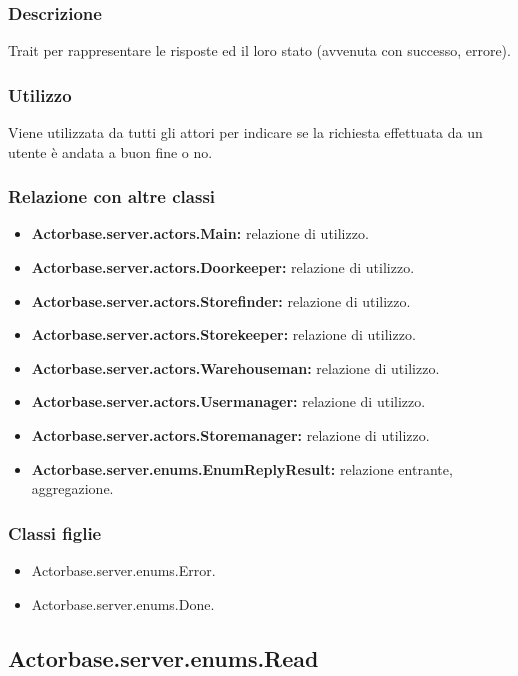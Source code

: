\documentclass[a4paper]{article}
\begin{document}
			\subsubsection{Descrizione}
				Trait per rappresentare le risposte ed il loro stato (avvenuta con successo, errore). 
				
			\subsubsection{Utilizzo}
				Viene utilizzata da tutti gli attori per indicare se la richiesta effettuata da un utente è andata a buon fine o no.
				
			\subsubsection{Relazione con altre classi}
				\begin{itemize}
					\item \textbf{Actorbase.server.actors.Main:} relazione di utilizzo.
					\item \textbf{Actorbase.server.actors.Doorkeeper:} relazione di utilizzo.
					\item \textbf{Actorbase.server.actors.Storefinder:} relazione di utilizzo.
					\item \textbf{Actorbase.server.actors.Storekeeper:} relazione di utilizzo.
					\item \textbf{Actorbase.server.actors.Warehouseman:} relazione di utilizzo.
					\item \textbf{Actorbase.server.actors.Usermanager:} relazione di utilizzo.
					\item \textbf{Actorbase.server.actors.Storemanager:} relazione di utilizzo.
					\item \textbf{Actorbase.server.enums.EnumReplyResult:} relazione entrante, aggregazione.
				\end{itemize}
				
			\subsubsection{Classi figlie}
				\begin{itemize}
					\item Actorbase.server.enums.Error.
					\item Actorbase.server.enums.Done.
				\end{itemize}				
						
		\subsection{Actorbase.server.enums.Read}
\end{document}
